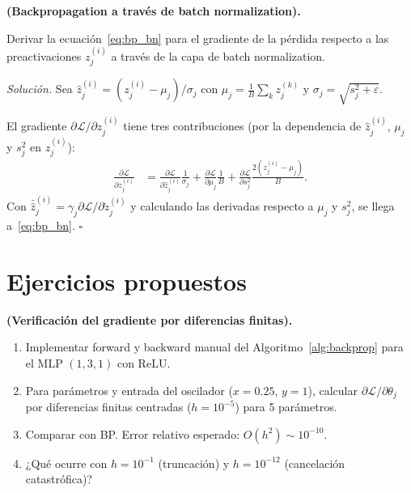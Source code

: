 \begin{ejercicio}
\label{ej:bp_batchnorm}
\textbf{(Backpropagation a través de batch normalization).}

Derivar la ecuación~\eqref{eq:bp_bn} para el gradiente de la
pérdida respecto a las preactivaciones $z_j^{(i)}$ a través de la
capa de batch normalization.

\medskip\noindent\textit{Solución.}
Sea $\hat{z}_j^{(i)} = (z_j^{(i)}-\mu_j)/\sigma_j$ con
$\mu_j = \frac{1}{B}\sum_k z_j^{(k)}$ y
$\sigma_j = \sqrt{s_j^2+\varepsilon}$.

El gradiente $\partial\mathcal{L}/\partial z_j^{(i)}$ tiene tres
contribuciones (por la dependencia de $\hat{z}_j^{(i)}$, $\mu_j$ y
$s_j^2$ en $z_j^{(i)}$):
\begin{align*}
  \frac{\partial\mathcal{L}}{\partial z_j^{(i)}}
  &= \frac{\partial\mathcal{L}}{\partial\hat{z}_j^{(i)}}
  \frac{1}{\sigma_j}
  + \frac{\partial\mathcal{L}}{\partial\mu_j}\frac{1}{B}
  + \frac{\partial\mathcal{L}}{\partial s_j^2}
  \frac{2(z_j^{(i)}-\mu_j)}{B}.
\end{align*}
Con $\bar{\hat{z}}_j^{(i)} = \gamma_j
\partial\mathcal{L}/\partial\tilde{z}_j^{(i)}$ y calculando las
derivadas respecto a $\mu_j$ y $s_j^2$, se llega
a~\eqref{eq:bp_bn}. $\square$
\end{ejercicio}

\section*{Ejercicios propuestos}

\begin{ejercicio}
\textbf{(Verificación del gradiente por diferencias finitas).}
\begin{enumerate}[label=(\alph*)]
  \item Implementar forward y backward manual del
        Algoritmo~\ref{alg:backprop} para el MLP $(1, 3, 1)$ con ReLU.
  \item Para parámetros y entrada del oscilador ($x = 0.25$, $y = 1$),
        calcular $\partial\mathcal{L}/\partial\theta_j$ por diferencias
        finitas centradas ($h = 10^{-5}$) para 5 parámetros.
  \item Comparar con BP. Error relativo esperado: $O(h^2) \sim 10^{-10}$.
  \item ¿Qué ocurre con $h = 10^{-1}$ (truncación) y $h = 10^{-12}$
        (cancelación catastrófica)?
\end{enumerate}
\end{ejercicio}

